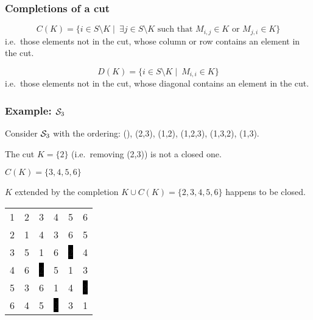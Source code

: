 \documentclass{beamer}
\newcommand{\cS}{{\cal S}}
\begin{document}
\begin{frame}\frametitle{Completions of a cut}

\begin{definition}
$$C(K)=\{i\in S\setminus K \mid\ \exists j\in S\setminus K \text{ such that } M_{i,j}\in K \text{ or } M_{j,i}\in K\} $$
\noindent i.e.\ those elements not in the cut, whose column or row contains an element in the cut.
\end{definition}

\begin{definition}
$$D(K)=\{i\in S\setminus K \mid\ M_{i,i}\in K \} $$
\noindent i.e.\ those elements not in the cut, whose diagonal contains an element in the cut.
\end{definition}
\end{frame}

\begin{frame}\frametitle{Example: $\cS_3$}
Consider $\cS_3$ with the ordering:  (), (2,3), (1,2), (1,2,3), (1,3,2), (1,3).

The cut $K=\{2\}$ (i.e.\ removing (2,3)) is not a closed one. 

$C(K)=\{3,4,5,6\}$

$K$ extended by the completion  $K\cup C(K)=\{2,3,4,5,6\}$ happens to be closed.

\begin{center}
\setlength{\fboxsep}{1pt}
\begin{tabular}{cccccc}
1&\color{lgr}2&3&4&5&6\\
\color{lgr}2&\color{lgr}1&\color{lgr}4&\color{lgr}3&\color{lgr}6&\color{lgr}5\\
3&\color{lgr}5&1&6&\color{white}\colorbox{black}{2}&4\\
4&\color{lgr}6&\color{white}\colorbox{black}{2}&5&1&3\\
5&\color{lgr}3&6&1&4&\color{white}\colorbox{black}{2}\\
6&\color{lgr}4&5&\color{white}\colorbox{black}{2}&3&1\\
\end{tabular}
\end{center}
\end{frame}
\end{document}
